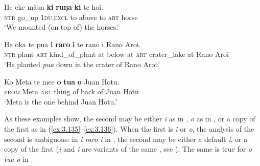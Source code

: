\ea\label{ex:3.136}
\gll He eke māua \textbf{ki} \textbf{ruŋa} \textbf{ki} te hoi.\\
\textsc{ntr} go\_up \textsc{1du.excl} to above to \textsc{art} horse\\

\glt 
‘We mounted (on top of) the horses.’ \textstyleExampleref{[R126.045]} 
\z

\ea\label{ex:3.137}
\gll He {\ꞌ}oka te pua \textbf{{\ꞌ}i} \textbf{raro} \textbf{i} te rano {\ꞌ}i Rano {\ꞌ}Aroi.  \\
\textsc{ntr} plant \textsc{art} kind\_of\_plant at below at \textsc{art} crater\_lake at Rano Aroi  \\

\glt 
‘He planted \textit{pua} down in the crater of Rano Aroi.’ \textstyleExampleref{[Mtx-6-05.006]}
\z

\ea\label{ex:3.138}
\gll Ko Meta te me{\ꞌ}e \textbf{o} \textbf{tu{\ꞌ}a} \textbf{o} Juan Hotu.\\
\textsc{prom} Meta \textsc{art} thing of back of Juan Hotu\\

\glt
‘Meta is the one behind Juan Hotu.’ \textstyleExampleref{[R412.214]} 
\z

As these examples show, the second  may be either \textit{i} as in , \textit{o} as in , or a copy of the first  as in (\ref{ex:3.135}–\ref{ex:3.136}). When the first  is \textit{{\ꞌ}i} or \textit{o}, the analysis of the second  is ambiguous: in \textit{{\ꞌ}i raro i} in , the second  may be either a default  \textit{i}, or a copy of the first  (\textit{{\ꞌ}i} and \textit{i} are variants of the same , see ). The same is true for \textit{o tu{\ꞌ}a o} in .

